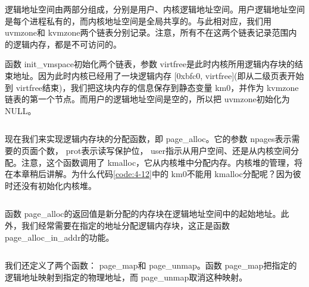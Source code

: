 \documentclass[main.tex]{subfiles}
\begin{document}
\begin{CJK*}{UTF8}{song}
逻辑地址空间由两部分组成，分别是用户、内核逻辑地址空间。用户逻辑地址空间是每个进程私有的，而内核地址空间是全局共享的。与此相对应，我们用 uvm\-zone和 kvm\-zone两个链表分别记录。注意，所有不在这两个链表记录范围内的逻辑内存，都是不可访问的。

\par
函数 init\_\-vmspace初始化两个链表，参数 virt\-free是此时内核所用逻辑内存块的结束地址。因为此时内核已经用了一块逻辑内存 [0xbfc0, virt\-free](即从二级页表开始到 virt\-free结束)，我们把这块内存的信息保存到静态变量 km0，并作为 kvm\-zone链表的第一个节点。而用户的逻辑地址空间是空的，所以把 uvm\-zone初始化为 NULL。

\begin{code}
\label{code:4-12}
\inputminted[firstline=38,lastline=47,linenos,numbersep=5pt,frame=lines,framesep=2mm]{c}{src/chapter04/kernel/page.c}
\end{code}

现在我们来实现逻辑内存块的分配函数，即 page\_\-alloc。它的参数 npages表示需要的页面个数， prot表示读写保护位， user指示从用户空间、还是从内核空间分配。注意，这个函数调用了 kmalloc，它从内核堆中分配内存。内核堆的管理，将在本章稍后讲解。为什么代码\ref{code:4-12}中的 km0不能用 kmalloc分配呢？因为彼时还没有初始化内核堆。

\begin{code}
\label{code:4-13}
\inputminted[firstline=112,lastline=174,linenos,numbersep=5pt,frame=lines,framesep=2mm]{c}{src/chapter04/kernel/page.c}
\end{code}

\noindent
函数 page\_\-alloc的返回值是新分配的内存块在逻辑地址空间中的起始地址。此外，我们经常需要在指定的地址分配逻辑内存块，这正是函数 page\_\-alloc\_\-in\_\-addr的功能。

\begin{code}
\label{code:4-14}
\inputminted[firstline=49,lastline=110,linenos,numbersep=5pt,frame=lines,framesep=2mm]{c}{src/chapter04/kernel/page.c}
\end{code}

我们还定义了两个函数： page\_\-map和 page\_\-unmap。函数 page\_\-map把指定的逻辑地址映射到指定的物理地址，而 page\_\-unmap取消这种映射。

\begin{code}
\label{code:4-15}
\inputminted[firstline=239,lastline=252,linenos,numbersep=5pt,frame=lines,framesep=2mm]{c}{src/chapter04/kernel/page.c}
\end{code}


\end{CJK*}
\end{document}
